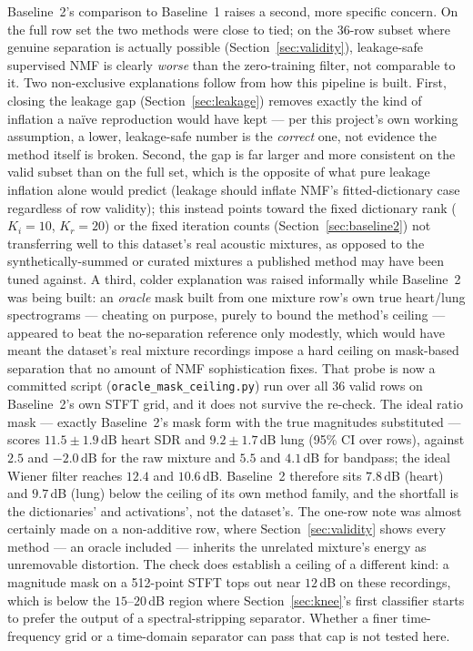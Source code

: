 \documentclass[11pt]{article}
\begin{document}
Baseline~2's comparison to Baseline~1 raises a second, more specific
concern. On the full row set the two methods were close to tied; on the
36-row subset where genuine separation is actually possible
(Section~\ref{sec:validity}), leakage-safe supervised NMF is clearly
\emph{worse} than the zero-training filter, not comparable to it. Two
non-exclusive explanations follow from how this pipeline is built. First,
closing the leakage gap (Section~\ref{sec:leakage}) removes exactly the
kind of inflation a na\"ive reproduction would have kept --- per this
project's own working assumption, a lower, leakage-safe number is the
\emph{correct} one, not evidence the method itself is broken. Second, the
gap is far larger and more consistent on the valid subset than on the full
set, which is the opposite of what pure leakage inflation alone would
predict (leakage should inflate NMF's fitted-dictionary case regardless of
row validity); this instead points toward the fixed dictionary rank
($K_i{=}10$, $K_r{=}20$) or the fixed iteration counts
(Section~\ref{sec:baseline2}) not transferring well to this dataset's real
acoustic mixtures, as opposed to the synthetically-summed or curated
mixtures a published method may have been tuned against. A third, colder explanation was raised informally while Baseline~2 was
being built: an \emph{oracle} mask built from one mixture row's own true
heart/lung spectrograms --- cheating on purpose, purely to bound the
method's ceiling --- appeared to beat the no-separation reference only
modestly, which would have meant the dataset's real mixture recordings
impose a hard ceiling on mask-based separation that no amount of NMF
sophistication fixes. That probe is now a committed script
(\texttt{oracle\_mask\_ceiling.py}) run over all 36 valid rows on
Baseline~2's own STFT grid, and it does not survive the re-check. The ideal
ratio mask --- exactly Baseline~2's mask form with the true magnitudes
substituted --- scores $11.5 \pm 1.9$\,dB heart SDR and $9.2 \pm 1.7$\,dB
lung (95\% CI over rows), against $2.5$ and $-2.0$\,dB for the raw mixture
and $5.5$ and $4.1$\,dB for bandpass; the ideal Wiener filter reaches
$12.4$ and $10.6$\,dB. Baseline~2 therefore sits $7.8$\,dB (heart) and
$9.7$\,dB (lung) below the ceiling of its own method family, and the
shortfall is the dictionaries' and activations', not the dataset's. The
one-row note was almost certainly made on a non-additive row, where
Section~\ref{sec:validity} shows every method --- an oracle included ---
inherits the unrelated mixture's energy as unremovable distortion. The
check does establish a ceiling of a different kind: a magnitude mask on a
512-point STFT tops out near $12$\,dB on these recordings, which is below
the $15$--$20$\,dB region where Section~\ref{sec:knee}'s first classifier
starts to prefer the output of a spectral-stripping separator. Whether a finer time-frequency grid or a
time-domain separator can pass that cap is not tested here.
\end{document}
